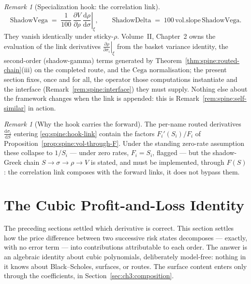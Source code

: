 \documentclass[11pt]{book}
\theoremstyle{plain}
\theoremstyle{definition}
\theoremstyle{remark}
\newtheorem{remark}[theorem]{Remark}
\newcommand{\volslope}{\mathrm{vol.slope}}       %
\newcommand{\Cega}{\mathrm{Cega}}                %
\newcommand{\shvega}{\mathrm{ShadowVega}}
\newcommand{\shdelta}{\mathrm{ShadowDelta}}
\newcommand{\stickyrho}{\textnormal{sticky-}\ensuremath{\rho}} %
\newcommand{\SigmaM}{\Sigma_M}                   %
\newcommand{\dd}{\mathrm{d}}                                  %
\newcommand{\pd}[2]{\frac{\partial #1}{\partial #2}}          %
\newcommand{\td}[2]{\frac{\dd #1}{\dd #2}}                    %
\newcommand{\atfixed}[2]{\left.#1\right|_{#2}}                %
\begin{document}
\begin{remark}[Specialization hook: the correlation link]
\begin{equation}
  \shvega \;=\; \frac{1}{100}\,\pd{V}{\rho}\,
                \atfixed{\td{\rho}{\sigma}}{\xi},
  \qquad
  \shdelta \;=\; 100\,\volslope\,\shvega .
\end{equation}
They vanish identically under \stickyrho{}. Volume~II, Chapter~2 owns the
evaluation of the link derivatives
$\atfixed{\pd{\rho}{\sigma_i}}{\xi}$ from the basket variance identity, the
second-order (shadow-gamma) terms generated by
Theorem~\ref{thm:spine:routed-chain}(iii) on the completed route, and the
$\Cega$ normalisation; the present section fixes, once and for all, the
operator those computations instantiate and the interface
(Remark~\ref{rem:spine:interface}) they must supply. Nothing else about the
framework changes when the link is appended: this is
Remark~\ref{rem:spine:self-similar} in action.
\end{remark}


\begin{remark}[Why the hook carries the forward]\label{rem:spine:hook-forward}
The per-name routed derivatives $\td{\sigma_i}{S}$ entering
\eqref{eq:spine:hook-link} contain the factors $F_i'(S_i)/F_i$ of
Proposition~\ref{prop:spine:vol-through-F}. Under the standing zero-rate
assumption these collapse to $1/S_i$ --- under zero rates, $F_i = S_i$,
flagged --- but the shadow-Greek chain
$S \to \sigma \to \rho \to V$ is stated, and must be implemented, through
$F(S)$: the correlation link composes with the forward links, it does not
bypass them.
\end{remark}
\section{The Cubic Profit-and-Loss Identity}\label{sec:ch3:cubic}

The preceding sections settled which derivative is correct. This section
settles how the price difference between two successive risk states
decomposes --- exactly, with no error term --- into contributions
attributable to each order. The answer is an algebraic identity
about cubic polynomials, deliberately model-free: nothing in it knows
about Black--Scholes, surfaces, or routes. The surface content enters only
through the coefficients, in Section~\ref{sec:ch3:composition}.
\end{document}
